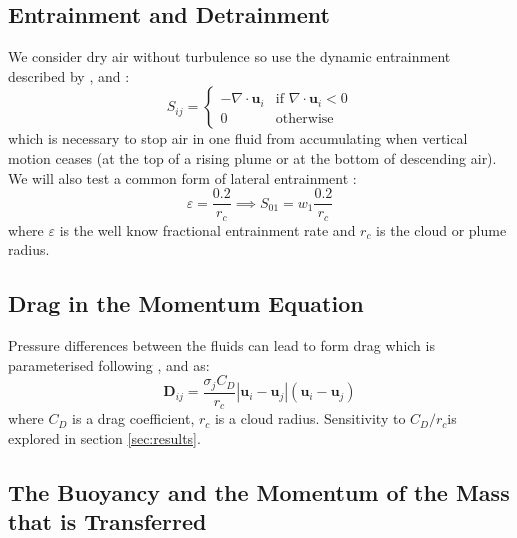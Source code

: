 \documentclass[draft]{agujournal2019}
\begin{document}
\subsection{Entrainment and Detrainment \label{subsec:Sij}}

We consider dry air without turbulence so use the dynamic entrainment
described by , and :
\begin{equation}
S_{ij}=\begin{cases}
-\nabla\cdot\mathbf{u}_{i} & \text{if }\nabla\cdot\mathbf{u}_{i}<0\\
0 & \text{otherwise}
\end{cases}
\end{equation}
which is necessary to stop air in one fluid from accumulating when
vertical motion ceases (at the top of a rising plume or at the bottom
of descending air). We will also test a common form of lateral entrainment
\cite{DBF+13}:
\begin{equation}
\varepsilon=\frac{0.2}{r_{c}}\implies S_{01}=w_{1}\frac{0.2}{r_{c}}
\end{equation}
where $\varepsilon$ is the well know fractional entrainment rate
and $r_{c}$ is the cloud or plume radius. 

\subsection{Drag in the Momentum Equation\label{subsec:drag}}

Pressure differences between the fluids can lead to form drag which
is parameterised following ,  and  as: 
\begin{equation}
\mathbf{D}_{ij}=\frac{\sigma_{j}C_{D}}{r_{c}}|\mathbf{u}_{i}-\mathbf{u}_{j}|\left(\mathbf{u}_{i}-\mathbf{u}_{j}\right)\label{eq:dragBubble}
\end{equation}
where $C_{D}$ is a drag coefficient, $r_{c}$ is a cloud radius.
Sensitivity to $C_{D}/r_{c}$is explored in section \ref{sec:results}. 

\subsection{The Buoyancy and the Momentum of the Mass that is Transferred \label{subsec:transferProperties}}
\end{document}

